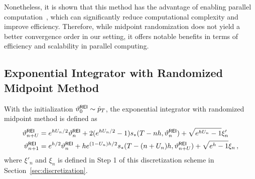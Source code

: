 \documentclass[11pt]{article}
\begin{document}
Nonetheless, it is shown that this method has the advantage of enabling parallel computation~\cite{gupta2024faster, li2024improved}, which can significantly reduce computational complexity and improve efficiency. 
Therefore, while midpoint randomization does not yield a better convergence order in our setting, it offers notable benefits in terms of efficiency and scalability in parallel computing.

\subsection{Exponential Integrator with Randomized Midpoint Method}
\label{sec:REI}
With the initialization $\vartheta^{\sf REI}_{0}\sim\hat p_T$, the exponential integrator with randomized midpoint method is defined as
\begin{align*}
\vartheta^{\sf REI}_{n+U}&=e^{hU_n/2}\vartheta^{\sf REI}_{n}
+2(e^{hU_n/2}-1)s_*(T-nh,\vartheta^{\sf REI}_{n}) +\sqrt{e^{hU_n}-1}\xi'_n\\
\vartheta^{\sf REI}_{n+1}&=e^{h/2}\vartheta^{\sf REI}_{n}
+he^{(1-U_n)h/2}s_*(T-(n+U_n)h,\vartheta^{\sf REI}_{n+U}) +\sqrt{e^h-1}\xi_n\,,
\end{align*}
where $\xi'_n$ and $\xi_n$ is defined in Step 1 of this discretization scheme in Section~\ref{sec:discretization}.
\end{document}
